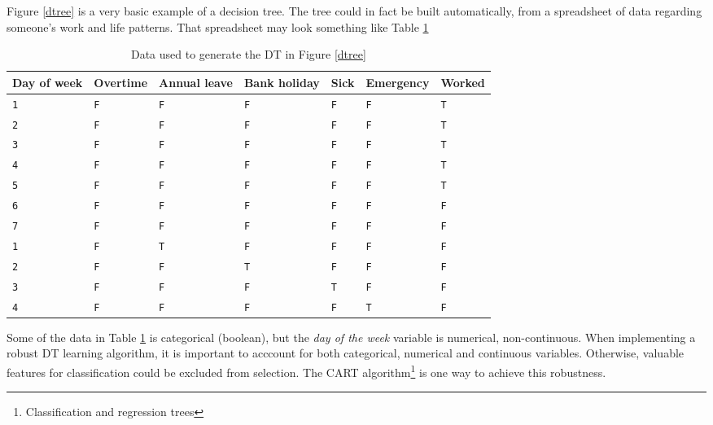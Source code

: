Figure \ref{dtree} is a very basic example of a decision tree.
The tree could in fact be built automatically, from a spreadsheet
of data regarding someone's work and life patterns.  That spreadsheet
may look something like Table \ref{dtreed}

\begin{table}
    \begin{tabular}{|l|l|l|l|l|l||l|}
        \hline
        Day of week & Overtime & Annual leave & Bank holiday & Sick & Emergency & Worked\\
        \hline
        {\tt 1} & {\tt F} & {\tt F} & {\tt F} & {\tt F} & {\tt F} & {\tt T}\\
        {\tt 2} & {\tt F} & {\tt F} & {\tt F} & {\tt F} & {\tt F} & {\tt T}\\
        {\tt 3} & {\tt F} & {\tt F} & {\tt F} & {\tt F} & {\tt F} & {\tt T}\\
        {\tt 4} & {\tt F} & {\tt F} & {\tt F} & {\tt F} & {\tt F} & {\tt T}\\
        {\tt 5} & {\tt F} & {\tt F} & {\tt F} & {\tt F} & {\tt F} & {\tt T}\\
        {\tt 6} & {\tt F} & {\tt F} & {\tt F} & {\tt F} & {\tt F} & {\tt F}\\
        {\tt 7} & {\tt F} & {\tt F} & {\tt F} & {\tt F} & {\tt F} & {\tt F}\\
        {\tt 1} & {\tt F} & {\tt T} & {\tt F} & {\tt F} & {\tt F} & {\tt F}\\
        {\tt 2} & {\tt F} & {\tt F} & {\tt T} & {\tt F} & {\tt F} & {\tt F}\\
        {\tt 3} & {\tt F} & {\tt F} & {\tt F} & {\tt T} & {\tt F} & {\tt F}\\
        {\tt 4} & {\tt F} & {\tt F} & {\tt F} & {\tt F} & {\tt T} & {\tt F}\\
        \hline
    \end{tabular}
    \caption{Data used to generate the DT in Figure \ref{dtree}\label{dtreed}}
\end{table}

Some of the data in Table \ref{dtreed} is categorical (boolean), but the
{\it day of the week} variable is numerical, non-continuous.  When implementing
a robust DT learning algorithm, it is important to acccount for both
categorical, numerical and continuous variables.  Otherwise, valuable
features for classification could be excluded from selection.  The CART
algorithm\footnote{Classification and regression trees}
\cite{breiman1984} is one way to achieve this robustness.

